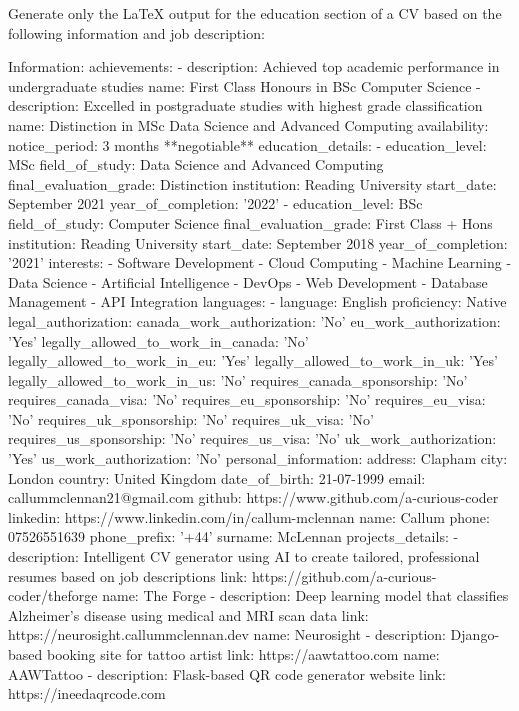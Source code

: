 
    Generate only the LaTeX output for the education section of a CV based on the following information and job description:

    Information:
    achievements:
- description: Achieved top academic performance in undergraduate studies
  name: First Class Honours in BSc Computer Science
- description: Excelled in postgraduate studies with highest grade classification
  name: Distinction in MSc Data Science and Advanced Computing
availability:
  notice_period: 3 months **negotiable**
education_details:
- education_level: MSc
  field_of_study: Data Science and Advanced Computing
  final_evaluation_grade: Distinction
  institution: Reading University
  start_date: September 2021
  year_of_completion: '2022'
- education_level: BSc
  field_of_study: Computer Science
  final_evaluation_grade: First Class + Hons
  institution: Reading University
  start_date: September 2018
  year_of_completion: '2021'
interests:
- Software Development
- Cloud Computing
- Machine Learning
- Data Science
- Artificial Intelligence
- DevOps
- Web Development
- Database Management
- API Integration
languages:
- language: English
  proficiency: Native
legal_authorization:
  canada_work_authorization: 'No'
  eu_work_authorization: 'Yes'
  legally_allowed_to_work_in_canada: 'No'
  legally_allowed_to_work_in_eu: 'Yes'
  legally_allowed_to_work_in_uk: 'Yes'
  legally_allowed_to_work_in_us: 'No'
  requires_canada_sponsorship: 'No'
  requires_canada_visa: 'No'
  requires_eu_sponsorship: 'No'
  requires_eu_visa: 'No'
  requires_uk_sponsorship: 'No'
  requires_uk_visa: 'No'
  requires_us_sponsorship: 'No'
  requires_us_visa: 'No'
  uk_work_authorization: 'Yes'
  us_work_authorization: 'No'
personal_information:
  address: Clapham
  city: London
  country: United Kingdom
  date_of_birth: 21-07-1999
  email: callummclennan21@gmail.com
  github: https://www.github.com/a-curious-coder
  linkedin: https://www.linkedin.com/in/callum-mclennan
  name: Callum
  phone: 07526551639
  phone_prefix: '+44'
  surname: McLennan
projects_details:
- description: Intelligent CV generator using AI to create tailored, professional
    resumes based on job descriptions
  link: https://github.com/a-curious-coder/theforge
  name: The Forge
- description: Deep learning model that classifies Alzheimer's disease using medical
    and MRI scan data
  link: https://neurosight.callummclennan.dev
  name: Neurosight
- description: Django-based booking site for tattoo artist
  link: https://aawtattoo.com
  name: AAWTattoo
- description: Flask-based QR code generator website
  link: https://ineedaqrcode.com
